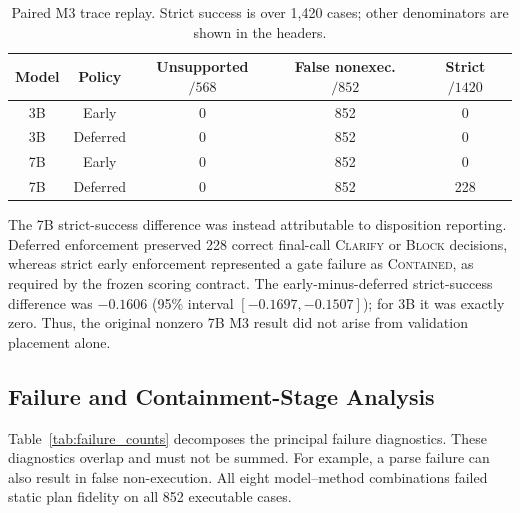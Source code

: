 \documentclass[conference]{IEEEtran}
\newcommand{\Mthree}{\textsc{M3}\xspace}
\begin{document}
\begin{table}[t]
\caption{Paired M3 trace replay. Strict success is over 1,420 cases; other
denominators are shown in the headers.}
\label{tab:placement_replay}
\centering
\footnotesize
\setlength{\tabcolsep}{4pt}
\begin{tabular}{@{}ccccc@{}}
\toprule
Model & Policy & Unsupported $/568$ & False nonexec. $/852$ & Strict $/1420$ \\
\midrule
3B & Early & 0 & 852 & 0 \\
3B & Deferred & 0 & 852 & 0 \\
7B & Early & 0 & 852 & 0 \\
7B & Deferred & 0 & 852 & 228 \\
\bottomrule
\end{tabular}
\end{table}

The 7B strict-success difference was instead attributable to disposition
reporting. Deferred enforcement preserved 228 correct final-call \textsc{Clarify}
or \textsc{Block} decisions, whereas strict early enforcement represented a gate
failure as \textsc{Contained}, as required by the frozen scoring contract. The
early-minus-deferred strict-success difference was $-0.1606$ (95\% interval
$[-0.1697,-0.1507]$); for 3B it was exactly zero. Thus, the original nonzero 7B
\Mthree result did not arise from validation placement alone.

\subsection{Failure and Containment-Stage Analysis}

Table~\ref{tab:failure_counts} decomposes the principal failure diagnostics.
These diagnostics overlap and must not be summed. For example, a parse failure
can also result in false non-execution. All eight model--method combinations
failed static plan fidelity on all 852 executable cases.
\end{document}

